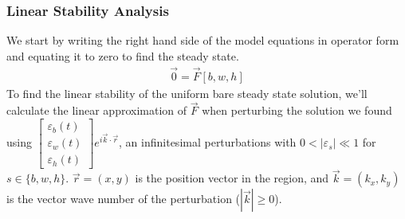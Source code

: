 \documentclass{article}
\numberwithin{equation}{section}
\begin{document}
\subsubsection{Linear Stability Analysis}
We start by writing the right hand side of the model equations in operator form and equating it to zero to find the steady state.
\begin{align}\label{eqn:functional_eq}
    \vec{0}=\vec{F}[b,w,h]
\end{align}
To find the linear stability of the uniform bare steady state solution, we'll calculate the linear approximation of $\vec{F}$  when perturbing the solution we found using $\begin{bmatrix}
    \varepsilon_b(t) \\ \varepsilon_w(t) \\ \varepsilon_h(t)
\end{bmatrix}e^{i\vec{k}\cdot\vec{r}}$, an infinitesimal perturbations with $0<|\varepsilon_s|\ll1$ for $s\in \{b,w,h\}$.  $\vec{r}=(x,y)$ is the position vector in the region, and $\vec{k}=(k_x,k_y)$ is the vector wave number of the perturbation ($|\vec{k}|\geq 0$). 
\end{document}
